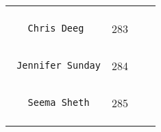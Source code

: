 \documentclass[]{article}
\begin{document}
\begin{longtable}[c]{@{}llll@{}}
\begin{minipage}[t]{0.13\columnwidth}
\end{minipage} & \begin{minipage}[t]{0.15\columnwidth}\raggedright
\end{minipage}
\\\noalign{\medskip}
\begin{minipage}[t]{0.39\columnwidth}\raggedright
\begin{verbatim}
   Chris Deeg
\end{verbatim}
\end{minipage} & \begin{minipage}[t]{0.10\columnwidth}\raggedright
283
\end{minipage} & \begin{minipage}[t]{0.13\columnwidth}\raggedright
\end{minipage} & \begin{minipage}[t]{0.15\columnwidth}\raggedright
\end{minipage}
\\\noalign{\medskip}
\begin{minipage}[t]{0.39\columnwidth}\raggedright
\begin{verbatim}
 Jennifer Sunday
\end{verbatim}
\end{minipage} & \begin{minipage}[t]{0.10\columnwidth}\raggedright
284
\end{minipage} & \begin{minipage}[t]{0.13\columnwidth}\raggedright
\end{minipage} & \begin{minipage}[t]{0.15\columnwidth}\raggedright
\end{minipage}
\\\noalign{\medskip}
\begin{minipage}[t]{0.39\columnwidth}\raggedright
\begin{verbatim}
   Seema Sheth
\end{verbatim}
\end{minipage} & \begin{minipage}[t]{0.10\columnwidth}\raggedright
285
\end{minipage} & \begin{minipage}[t]{0.13\columnwidth}\raggedright
\end{minipage} & \begin{minipage}[t]{0.15\columnwidth}\raggedright
\end{minipage}
\\\noalign{\medskip}
\begin{minipage}[t]{0.39\columnwidth}\raggedright

\end{minipage}
\end{longtable}
\end{document}
